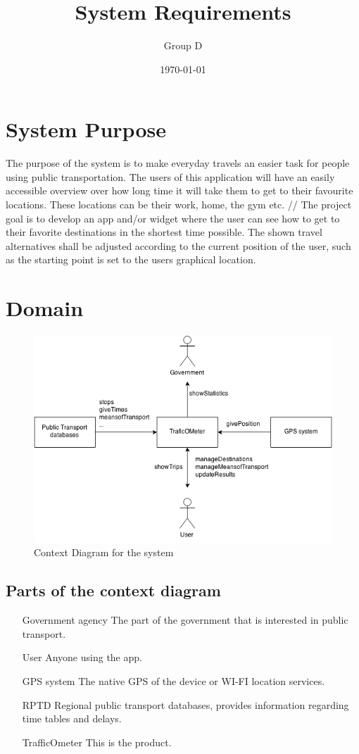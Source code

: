 \documentclass[a4paper]{article}
\title{System Requirements}
\author{Group D}
\date{\today}
\begin{document}
	\maketitle
	\thispagestyle{empty}
	\setcounter{page}{0}
	\pagebreak
	\tableofcontents
	\pagebreak
	

	\section{System Purpose} %
	The purpose of the system is to make everyday travels an easier task for people using public transportation. The users of this application will have an easily accessible overview over how long time it will take them to get to their favourite locations. These locations can be their work, home, the gym etc.
	//
	The project goal is to develop an app and/or widget where the user can see how to get to their favorite destinations in the shortest time possible. The shown travel alternatives shall be adjusted according to the current position of the user, such as the starting point is set to the users graphical location.
	\section{Domain}
		\begin{figure}[h]
				\includegraphics[scale=0.65]{Context-v1.png}
			\caption{Context Diagram for the system}
		\end{figure}
		\subsection{Parts of the context diagram} %
		\label{sub:parts_of_the_context_diagram}
		\begin{itemize}
			\item[Government agency] The part of the government that is interested in public transport. 
			\item[User] Anyone using the app.
			\item[GPS system] The native GPS of the device or WI-FI location services.
			\item[RPTD] Regional public transport databases, provides information regarding time tables and delays.
			\item[TrafficOmeter] This is the product.
		\end{itemize}
\end{document}
